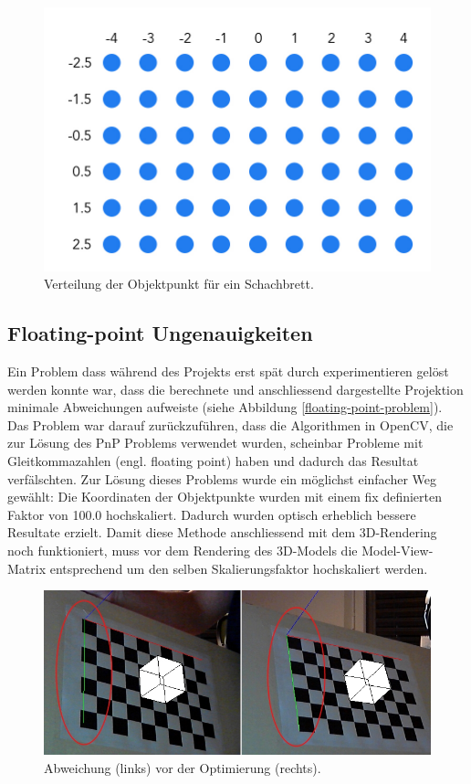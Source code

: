 \begin{figure}[!ht]
\centering
\includegraphics[scale=0.5]{images/object-points.jpg} 
\caption{Verteilung der Objektpunkt für ein Schachbrett.}
\label{fig:object-points}
\end{figure}


\subsection{Floating-point Ungenauigkeiten}

Ein Problem dass während des Projekts erst spät durch experimentieren gelöst werden konnte war, dass die berechnete und anschliessend dargestellte Projektion minimale Abweichungen aufweiste (siehe Abbildung \ref{floating-point-problem}). Das Problem war darauf zurückzuführen, dass die Algorithmen in OpenCV, die zur Lösung des PnP Problems verwendet wurden, scheinbar Probleme mit Gleitkommazahlen (engl. floating point) haben und dadurch das Resultat verfälschten.
\noindent
Zur Lösung dieses Problems wurde ein möglichst einfacher Weg gewählt: Die Koordinaten der Objektpunkte wurden mit einem fix definierten Faktor von 100.0 hochskaliert. Dadurch wurden optisch erheblich bessere Resultate erzielt. Damit diese Methode anschliessend mit dem 3D-Rendering noch funktioniert, muss vor dem Rendering des 3D-Models die Model-View-Matrix entsprechend um den selben Skalierungsfaktor hochskaliert werden.

\begin{figure}[!ht]
\centering
\includegraphics[scale=0.8]{images/floating-point-problem.jpg} 
\caption{Abweichung (links) vor der Optimierung (rechts).}
\label{fig:floating-point-problem}
\end{figure}


